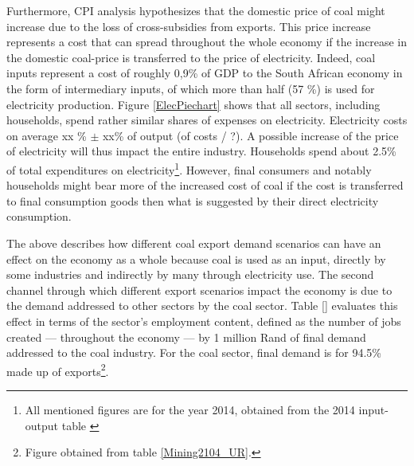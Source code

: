 \documentclass[12pt,english]{article}
\begin{document}
Furthermore, CPI analysis hypothesizes that the domestic price of coal might increase due to the loss of cross-subsidies from exports. This price increase represents a cost that can spread throughout the whole economy if the increase in the domestic coal-price is transferred to the price of electricity. Indeed, coal inputs represent a cost of roughly 0,9\% of GDP to the South African economy in the form of intermediary inputs, of which more than half (57 \%) is used for electricity production. %
Figure \ref{ElecPiechart} shows that all sectors, including households, spend rather similar shares of expenses on electricity.%
Electricity costs on average xx \% $\pm$ xx\% of output (of costs / ?). %
A possible increase of the price of electricity will thus impact the entire industry. Households spend about 2.5\% of total expenditures on electricity\footnote{All mentioned figures are for the year 2014, obtained from the 2014 input-output table \citep{IOT2014}}. However, %
final consumers and notably households might bear more of the increased cost of coal if the cost is transferred to final consumption goods then what is suggested by their direct electricity consumption.





The above describes how different coal export demand scenarios can have an effect on the economy as a whole because coal is used as an input, directly by some industries and indirectly by many through electricity use. The second channel through which different export scenarios impact the economy is due to the demand addressed to other sectors by the coal sector. Table \ref{} evaluates this effect in terms of the sector's employment content, defined as the number of jobs created --- throughout the economy --- by 1 million Rand of final demand addressed to the coal industry. For the coal sector, final demand is for 94.5\% made up of exports\footnote{Figure obtained from table \ref{Mining2104_UR}.}. 
\end{document}

